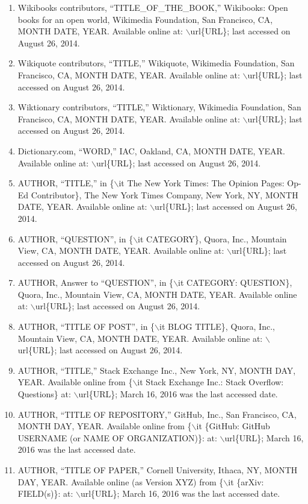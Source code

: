 \documentclass[letter,12pt]{article}
\begin{document}
\begin{enumerate}
\begin{enumerate}
	\item Wikibooks contributors, ``TITLE\_OF\_THE\_BOOK,'' Wikibooks: Open books for an open world, Wikimedia Foundation, San Francisco, CA, MONTH DATE, YEAR. Available online at: $\backslash$url\{URL\}; last accessed on August 26, 2014.
	\item Wikiquote contributors, ``TITLE,'' Wikiquote, Wikimedia Foundation, San Francisco, CA, MONTH DATE, YEAR. Available online at: $\backslash$url\{URL\}; last accessed on August 26, 2014.
	\item Wiktionary contributors, ``TITLE,'' Wiktionary, Wikimedia Foundation, San Francisco, CA, MONTH DATE, YEAR. Available online at: $\backslash$url\{URL\}; last accessed on August 26, 2014.
	\item Dictionary.com, ``WORD,'' IAC, Oakland, CA, MONTH DATE, YEAR. Available online at: $\backslash$url\{URL\}; last accessed on August 26, 2014.
	\item AUTHOR, ``TITLE,'' in \{$\backslash$it The New York Times: The Opinion Pages: Op-Ed Contributor\}, The New York Times Company, New York, NY, MONTH DATE, YEAR. Available online at: $\backslash$url\{URL\}; last accessed on August 26, 2014.
	\item AUTHOR, ``QUESTION'', in \{$\backslash$it CATEGORY\}, Quora, Inc., Mountain View, CA, MONTH DATE, YEAR. Available online at: $\backslash$url\{URL\}; last accessed on August 26, 2014.
	\item AUTHOR, Answer to ``QUESTION'', in \{$\backslash$it CATEGORY: QUESTION\}, Quora, Inc., Mountain View, CA, MONTH DATE, YEAR. Available online at: $\backslash$url\{URL\}; last accessed on August 26, 2014.
	\item AUTHOR, ``TITLE OF POST'', in \{$\backslash$it BLOG TITLE\}, Quora, Inc., Mountain View, CA, MONTH DATE, YEAR. Available online at: $\backslash$url\{URL\}; last accessed on August 26, 2014.
	\item AUTHOR, ``TITLE,'' Stack Exchange Inc., New York, NY, MONTH DAY, YEAR. Available online from \{$\backslash$it Stack Exchange Inc.: Stack Overflow: Questions\} at: $\backslash$url\{URL\}; March 16, 2016 was the last accessed date.
	\item AUTHOR, ``TITLE OF REPOSITORY,'' GitHub, Inc., San Francisco, CA, MONTH DAY, YEAR. Available online from \{$\backslash$it \{GitHub: GitHub USERNAME (or NAME OF ORGANIZATION)\}: at: $\backslash$url\{URL\}; March 16, 2016 was the last accessed date.
	\item AUTHOR, ``TITLE OF PAPER,'' Cornell University, Ithaca, NY, MONTH DAY, YEAR. Available online (as Version XYZ) from \{$\backslash$it \{arXiv: FIELD(s)\}: at: $\backslash$url\{URL\}; March 16, 2016 was the last accessed date.

\end{enumerate}
\end{enumerate}
\end{document}
